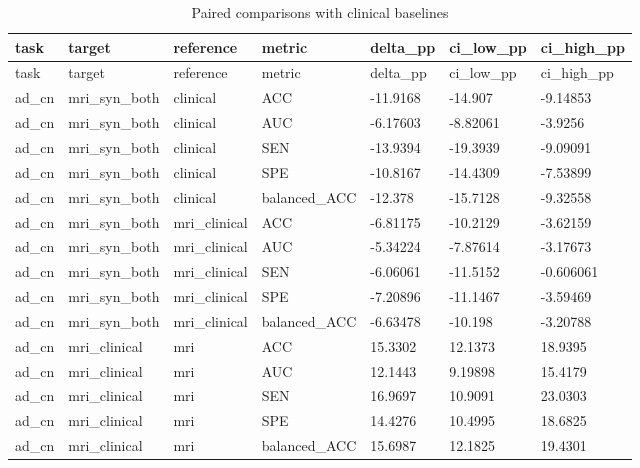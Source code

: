 \documentclass{article}
\begin{document}
\begin{landscape}
\begingroup
\footnotesize
\setlength{\tabcolsep}{4pt}
\begin{longtable}{lllllll}
\caption{{\color{blue}Paired comparisons with clinical baselines}}\label{tab:classification_clinical_comparisons}\\
\toprule
task & target & reference & metric & delta\_pp & ci\_low\_pp & ci\_high\_pp \\
\midrule
\endfirsthead
\toprule
task & target & reference & metric & delta\_pp & ci\_low\_pp & ci\_high\_pp \\
\midrule
\endhead
\bottomrule
\endfoot
ad\_cn & mri\_syn\_both & clinical & ACC & -11.9168 & -14.907 & -9.14853 \\
ad\_cn & mri\_syn\_both & clinical & AUC & -6.17603 & -8.82061 & -3.9256 \\
ad\_cn & mri\_syn\_both & clinical & SEN & -13.9394 & -19.3939 & -9.09091 \\
ad\_cn & mri\_syn\_both & clinical & SPE & -10.8167 & -14.4309 & -7.53899 \\
ad\_cn & mri\_syn\_both & clinical & balanced\_ACC & -12.378 & -15.7128 & -9.32558 \\
ad\_cn & mri\_syn\_both & mri\_clinical & ACC & -6.81175 & -10.2129 & -3.62159 \\
ad\_cn & mri\_syn\_both & mri\_clinical & AUC & -5.34224 & -7.87614 & -3.17673 \\
ad\_cn & mri\_syn\_both & mri\_clinical & SEN & -6.06061 & -11.5152 & -0.606061 \\
ad\_cn & mri\_syn\_both & mri\_clinical & SPE & -7.20896 & -11.1467 & -3.59469 \\
ad\_cn & mri\_syn\_both & mri\_clinical & balanced\_ACC & -6.63478 & -10.198 & -3.20788 \\
ad\_cn & mri\_clinical & mri & ACC & 15.3302 & 12.1373 & 18.9395 \\
ad\_cn & mri\_clinical & mri & AUC & 12.1443 & 9.19898 & 15.4179 \\
ad\_cn & mri\_clinical & mri & SEN & 16.9697 & 10.9091 & 23.0303 \\
ad\_cn & mri\_clinical & mri & SPE & 14.4276 & 10.4995 & 18.6825 \\
ad\_cn & mri\_clinical & mri & balanced\_ACC & 15.6987 & 12.1825 & 19.4301 \\

\end{longtable}
\end{landscape}
\end{document}
